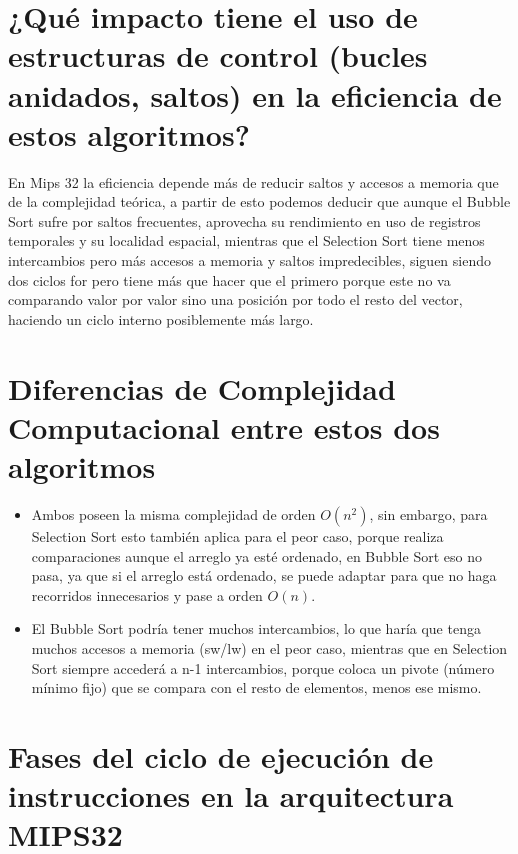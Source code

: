 \documentclass{article}
\begin{document}
\section*{¿Qué impacto tiene el uso de estructuras de control (bucles anidados, saltos) en la eficiencia de estos algoritmos?}

En Mips 32 la eficiencia depende más de reducir saltos y accesos a memoria que de la complejidad teórica, a partir de esto podemos deducir que aunque el Bubble Sort sufre por saltos frecuentes, aprovecha su rendimiento en uso de registros temporales y su localidad espacial, mientras que el Selection Sort tiene menos intercambios pero más accesos a memoria y saltos impredecibles, siguen siendo dos ciclos for pero tiene más que hacer que el primero porque este no va comparando valor por valor sino una posición por todo el resto del vector, haciendo un ciclo interno posiblemente más largo.

\section*{Diferencias de Complejidad Computacional entre estos dos algoritmos}

\begin{itemize}
    \item Ambos poseen la misma complejidad de orden $O(n^{2})$, sin embargo, para Selection Sort esto también aplica para el peor caso, porque realiza comparaciones aunque el arreglo ya esté ordenado, en Bubble Sort eso no pasa, ya que si el arreglo está ordenado, se puede adaptar para que no haga recorridos innecesarios y pase a orden $O(n)$.

    \item El Bubble Sort podría tener muchos intercambios, lo que haría que tenga muchos accesos a memoria (sw/lw) en el peor caso, mientras que en Selection Sort siempre accederá a n-1 intercambios, porque coloca un pivote (número mínimo fijo) que se compara con el resto de elementos, menos ese mismo.
\end{itemize}

\section*{Fases del ciclo de ejecución de instrucciones en la arquitectura MIPS32}
\end{document}
